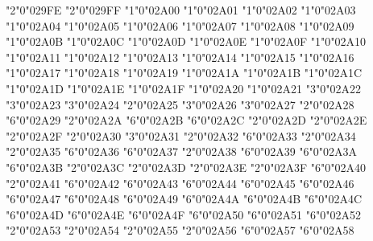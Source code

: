 \mchardef\tplus"2"0"029FE
\mchardef\tminus"2"0"029FF
\mchardef\bigodot"1"0"02A00
\mchardef\bigoplus"1"0"02A01
\mchardef\bigotimes"1"0"02A02
\mchardef\bigcupdot"1"0"02A03
\mchardef\biguplus"1"0"02A04
\mchardef\bigsqcap"1"0"02A05
\mchardef\bigsqcup"1"0"02A06
\mchardef\conjquant"1"0"02A07
\mchardef\disjquant"1"0"02A08
\mchardef\bigtimes"1"0"02A09
\mchardef\sumint"1"0"02A0B
\mchardef\iiiint"1"0"02A0C
\mchardef\intbar"1"0"02A0D
\mchardef\intBar"1"0"02A0E
\mchardef\fint"1"0"02A0F
\mchardef\cirfnint"1"0"02A10
\mchardef\awint"1"0"02A11
\mchardef\rppolint"1"0"02A12
\mchardef\scpolint"1"0"02A13
\mchardef\npolint"1"0"02A14
\mchardef\pointint"1"0"02A15
\mchardef\sqint"1"0"02A16
\mchardef\intlarhk"1"0"02A17
\mchardef\intx"1"0"02A18
\mchardef\intcap"1"0"02A19
\mchardef\intcup"1"0"02A1A
\mchardef\upint"1"0"02A1B
\mchardef\lowint"1"0"02A1C
\mchardef\Join"1"0"02A1D
\mchardef\bigtriangleleft"1"0"02A1E
\mchardef\zcmp"1"0"02A1F
\mchardef\zpipe"1"0"02A20
\mchardef\zproject"1"0"02A21
\mchardef\ringplus"3"0"02A22
\mchardef\plushat"3"0"02A23
\mchardef\simplus"3"0"02A24
\mchardef\plusdot"2"0"02A25
\mchardef\plussim"3"0"02A26
\mchardef\plussubtwo"3"0"02A27
\mchardef\plustrif"2"0"02A28
\mchardef\commaminus"6"0"02A29
\mchardef\minusdot"2"0"02A2A
\mchardef\minusfdots"6"0"02A2B
\mchardef\minusrdots"6"0"02A2C
\mchardef\opluslhrim"2"0"02A2D
\mchardef\oplusrhrim"2"0"02A2E
\mchardef\vectimes"2"0"02A2F
\mchardef\dottimes"2"0"02A30
\mchardef\timesbar"3"0"02A31
\mchardef\btimes"2"0"02A32
\mchardef\smashtimes"6"0"02A33
\mchardef\otimeslhrim"2"0"02A34
\mchardef\otimesrhrim"2"0"02A35
\mchardef\otimeshat"6"0"02A36
\mchardef\Otimes"6"0"02A37
\mchardef\odiv"2"0"02A38
\mchardef\triangleplus"6"0"02A39
\mchardef\triangleminus"6"0"02A3A
\mchardef\triangletimes"6"0"02A3B
\mchardef\intprod"2"0"02A3C
\mchardef\intprodr"2"0"02A3D
\mchardef\fcmp"2"0"02A3E
\mchardef\amalg"2"0"02A3F
\mchardef\capdot"6"0"02A40
\mchardef\uminus"2"0"02A41
\mchardef\barcup"6"0"02A42
\mchardef\barcap"6"0"02A43
\mchardef\capwedge"6"0"02A44
\mchardef\cupvee"6"0"02A45
\mchardef\cupovercap"6"0"02A46
\mchardef\capovercup"6"0"02A47
\mchardef\cupbarcap"6"0"02A48
\mchardef\capbarcup"6"0"02A49
\mchardef\twocups"6"0"02A4A
\mchardef\twocaps"6"0"02A4B
\mchardef\closedvarcup"6"0"02A4C
\mchardef\closedvarcap"6"0"02A4D
\mchardef\Sqcap"6"0"02A4E
\mchardef\Sqcup"6"0"02A4F
\mchardef\closedvarcupsmashprod"6"0"02A50
\mchardef\wedgeodot"6"0"02A51
\mchardef\veeodot"6"0"02A52
\mchardef\Wedge"2"0"02A53
\mchardef\Vee"2"0"02A54
\mchardef\wedgeonwedge"2"0"02A55
\mchardef\veeonvee"2"0"02A56
\mchardef\bigslopedvee"6"0"02A57
\mchardef\bigslopedwedge"6"0"02A58
